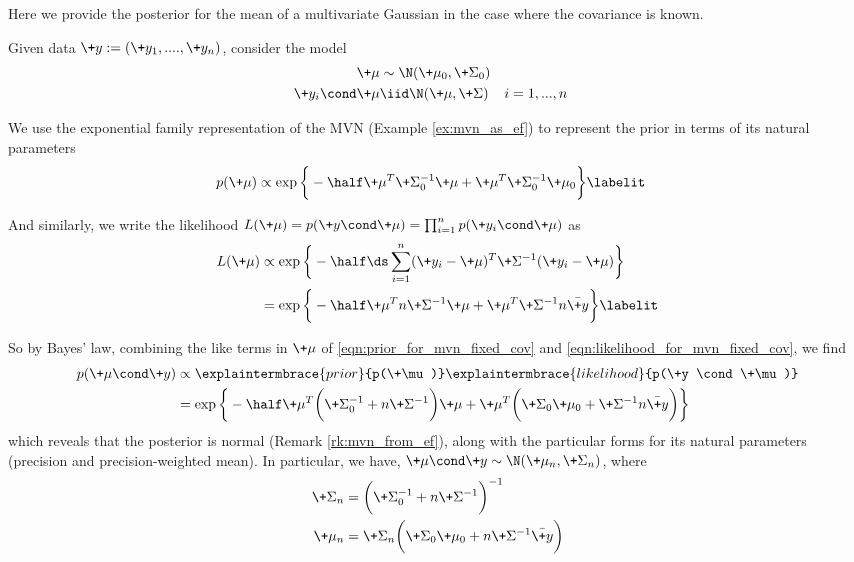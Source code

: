 \documentclass{article} %
\begin{document}
 
Here we provide the posterior for the mean of a multivariate Gaussian in the case where the covariance is known.

Given data $\+y :=(\+y_1, ....,\+y_n)$, consider the model
\begin{align*}
\+\mu &\sim \N(\+\mu_0, \+\Sigma_0) \\
\+y_i \cond \+\mu &\iid \N(\+\mu, \+\Sigma) && i=1,...,n
\end{align*}




We use the exponential family representation of the MVN (Example \ref{ex:mvn_as_ef}) to represent the prior in terms of its natural parameters
\begin{align*}
	p(\+\mu) &\propto \exp \bigg\{ -\half \+\mu^T \+\Sigma_0^{-1} \+\mu + \+\mu^T \+\Sigma_0^{-1} \+\mu_0 \bigg\} 
\labelit \label{eqn:prior_for_mvn_fixed_cov}
\end{align*}

And similarly, we write the likelihood $	L(\+\mu) = p(\+y \cond \+\mu) = \prod_{i=1}^n p(\+y_i \cond \+\mu)$  as
\begin{align*}
	L(\+\mu) &\propto \exp \bigg\{ -\half \ds\sum_{i=1}^n (\+y_i - \+\mu)^T \+\Sigma^{-1} (\+y_i - \+\mu)\bigg\}  \\
	&= \exp \bigg\{ - \half \+\mu^T n \+\Sigma^{-1} \+\mu + \+\mu^T \+\Sigma^{-1} n \bar{\+y} \bigg\} 
\labelit \label{eqn:likelihood_for_mvn_fixed_cov}
\end{align*}



So by Bayes' law, combining the like terms in $\+\mu$ of \eqref{eqn:prior_for_mvn_fixed_cov} and \eqref{eqn:likelihood_for_mvn_fixed_cov}, we find
\begin{align*}
 p(\+\mu \cond \+y) &\propto \explaintermbrace{prior}{p(\+\mu)}\explaintermbrace{likelihood}{p(\+y \cond \+\mu)} \\
 &= \exp \bigg\{ - \half \+\mu^T \bigg( \+\Sigma_0^{-1} + n  \+\Sigma^{-1}\bigg)  \+\mu + \+\mu^T \bigg( \+\Sigma_0 \+\mu_0 + \+\Sigma^{-1} n \bar{\+y} \bigg) \bigg\} 
\end{align*}
which reveals that the posterior is normal (Remark \ref{rk:mvn_from_ef}), along with the particular forms for its natural parameters (precision and precision-weighted mean).  In particular, we have, $\+\mu \cond \+y \sim \N(\+\mu_n, \+\Sigma_n)$, where
\begin{align*}
	\+\Sigma_n &= \bigg( \+\Sigma_0^{-1} + n \+\Sigma^{-1}\bigg)^{-1} \\
	\+\mu_n &= \+\Sigma_n \bigg(\+\Sigma_0 \+\mu_0 + n \+\Sigma^{-1} \bar{\+y}  \bigg)
\end{align*}
\end{document}
